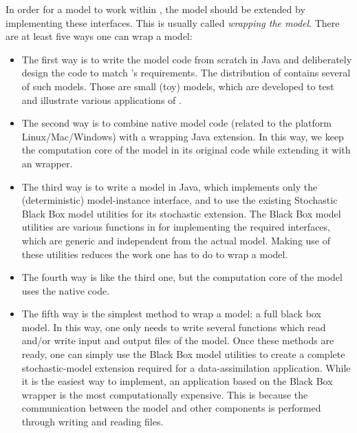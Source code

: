 In order for a model to work within \oda, the model should be extended by implementing these interfaces. This is usually called \emph{wrapping the model}. There are at least five ways one can wrap a model:
\begin{itemize}
\item The first way is to write the model code from scratch in Java and deliberately design the code to match \oda's requirements. The distribution of \oda contains several of such models. Those are small (toy) models, which are developed to test and illustrate various applications of \oda. 
\item The second way is to combine native model code (related to the platform Linux/Mac/Windows) with a wrapping Java extension. In this way, we keep the computation core of the model in its original code while extending it with an \oda wrapper. 
\item The third way is to write a model in Java, which implements only the (deterministic) model-instance interface, and to use the existing Stochastic Black Box model utilities for its stochastic extension. The Black Box model utilities are various functions in \oda for implementing the required interfaces, which are generic and independent from the actual model. Making use of these utilities reduces the work one has to do to wrap a model. 
\item The fourth way is like the third one, but the computation core of the model uses the native code. 
\item The fifth way is the simplest method to wrap a model: a full black box model. In this way, one only needs to write several functions which read and/or write input and output files of the model. Once these methods are ready, one can simply use the Black Box model utilities to create a complete stochastic-model extension required for a data-assimilation application. While it is the easiest way to implement, an application based on the Black Box wrapper is the most computationally expensive. This is because the communication between the model and other \oda components is performed through writing and reading files.
\end{itemize}

